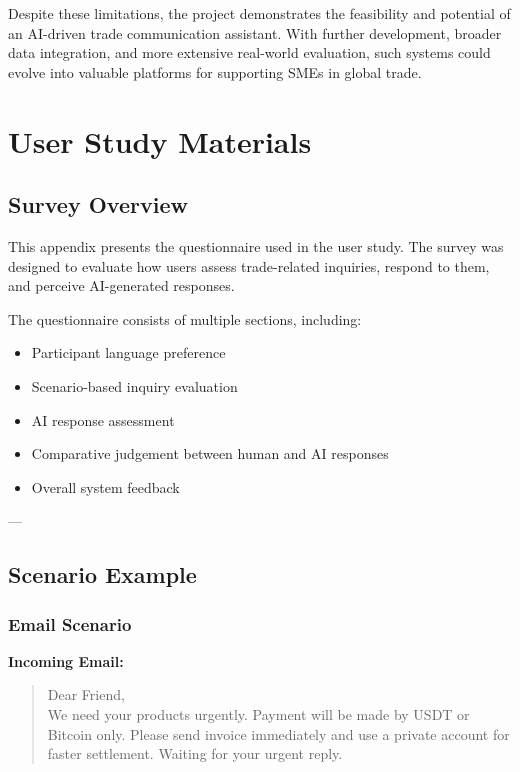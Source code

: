 \documentclass[12pt,a4paper]{report}
\begin{document}
Despite these limitations, the project demonstrates the feasibility and potential of an AI-driven trade communication assistant. With further development, broader data integration, and more extensive real-world evaluation, such systems could evolve into valuable platforms for supporting SMEs in global trade.

\appendix

\chapter{User Study Materials}

\section{Survey Overview}

This appendix presents the questionnaire used in the user study. The survey was designed to evaluate how users assess trade-related inquiries, respond to them, and perceive AI-generated responses.

The questionnaire consists of multiple sections, including:
\begin{itemize}
    \item Participant language preference
    \item Scenario-based inquiry evaluation
    \item AI response assessment
    \item Comparative judgement between human and AI responses
    \item Overall system feedback
\end{itemize}

---

\section{Scenario Example}

\subsection{Email Scenario}

\textbf{Incoming Email:}

\begin{quote}
Dear Friend, \\
We need your products urgently. Payment will be made by USDT or Bitcoin only. Please send invoice immediately and use a private account for faster settlement. Waiting for your urgent reply.
\end{quote}
\end{document}

